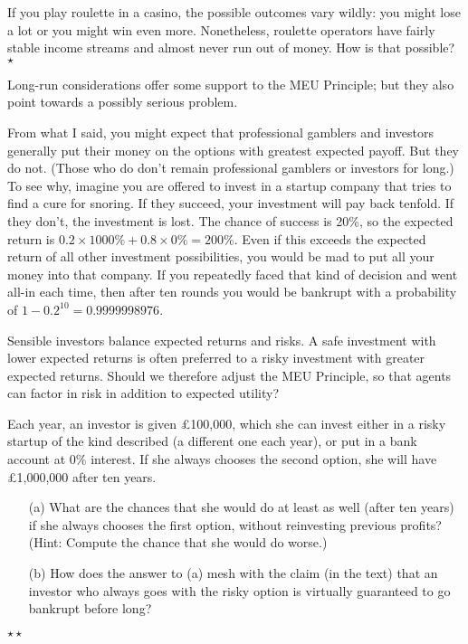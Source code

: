 \begin{exercise}
  If you play roulette in a casino, the possible outcomes vary wildly:
  you might lose a lot or you might win even more. Nonetheless,
  roulette operators have fairly stable income streams and almost
  never run out of money. How is that possible?  $\star$
\end{exercise}

Long-run considerations offer some support to the MEU Principle; but
they also point towards a possibly serious problem.

From what I said, you might expect that professional gamblers and
investors generally put their money on the options with greatest
expected payoff. But they do not. (Those who do don't remain
professional gamblers or investors for long.) To see why, imagine you
are offered to invest in a startup company that tries to find a cure
for snoring. If they succeed, your investment will pay back
tenfold. If they don't, the investment is lost. The chance of success
is 20\%, so the expected return is $0.2 \times 1000\% + 0.8 \times 0\% =
200\%$. Even if this exceeds the expected return of all other
investment possibilities, you would be mad to put all your money into
that company. If you repeatedly faced that kind of decision and went
all-in each time, then after ten rounds you would be bankrupt with a
probability of $1-0.2^{10} = 0.9999998976$.%

Sensible investors balance expected returns and risks. A safe
investment with lower expected returns is often preferred to a risky
investment with greater expected returns. Should we therefore adjust
the MEU Principle, so that agents can factor in risk in addition to
expected utility?

\begin{exercise}
  Each year, an investor is given £100,000, which she can invest
  either in a risky startup of the kind described (a different one
  each year), or put in a bank account at 0\% interest. If she always
  chooses the second option, she will have £1,000,000 after ten years.
  \begin{enumerate}
  \item[(a)] What are the chances that she would do at least as well
    (after ten years) if she always chooses the first option, without
    reinvesting previous profits? (Hint: Compute the chance that she
    would do worse.)
  \item[(b)] How does the answer to (a) mesh with the claim (in the
    text) that an investor who always goes with the risky option is
    virtually guaranteed to go bankrupt before long?
  \end{enumerate}
  $\star\star$
\end{exercise}

